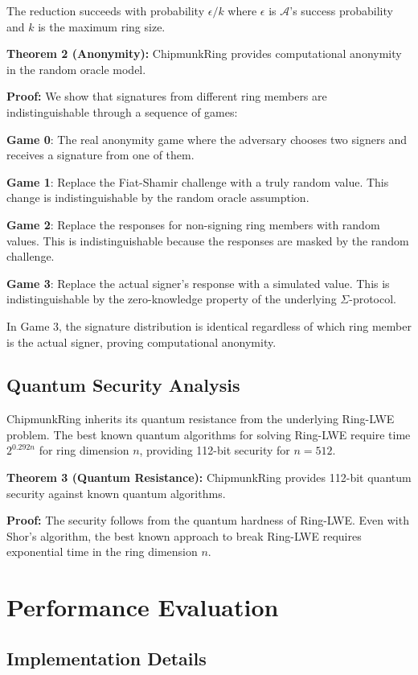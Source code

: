 \documentclass[11pt,a4paper]{article}
\begin{document}
The reduction succeeds with probability $\epsilon/k$ where $\epsilon$ is $\mathcal{A}$'s success probability and $k$ is the maximum ring size.

\textbf{Theorem 2 (Anonymity):} ChipmunkRing provides computational anonymity in the random oracle model.

\textbf{Proof:} We show that signatures from different ring members are indistinguishable through a sequence of games:

\textbf{Game 0}: The real anonymity game where the adversary chooses two signers and receives a signature from one of them.

\textbf{Game 1}: Replace the Fiat-Shamir challenge with a truly random value. This change is indistinguishable by the random oracle assumption.

\textbf{Game 2}: Replace the responses for non-signing ring members with random values. This is indistinguishable because the responses are masked by the random challenge.

\textbf{Game 3}: Replace the actual signer's response with a simulated value. This is indistinguishable by the zero-knowledge property of the underlying $\Sigma$-protocol.

In Game 3, the signature distribution is identical regardless of which ring member is the actual signer, proving computational anonymity.

\subsection{Quantum Security Analysis}

ChipmunkRing inherits its quantum resistance from the underlying Ring-LWE problem. The best known quantum algorithms for solving Ring-LWE require time $2^{0.292n}$ for ring dimension $n$, providing 112-bit security for $n = 512$.

\textbf{Theorem 3 (Quantum Resistance):} ChipmunkRing provides 112-bit quantum security against known quantum algorithms.

\textbf{Proof:} The security follows from the quantum hardness of Ring-LWE. Even with Shor's algorithm, the best known approach to break Ring-LWE requires exponential time in the ring dimension $n$.

\section{Performance Evaluation}

\subsection{Implementation Details}
\end{document}
